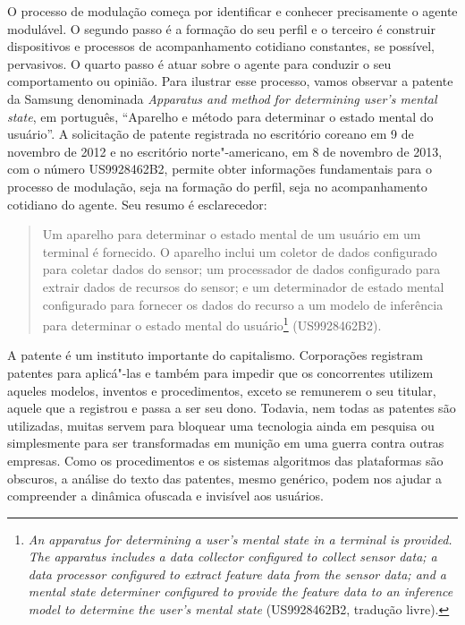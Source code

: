 O processo de modulação começa por identificar e conhecer precisamente o
agente modulável. O segundo passo é a formação do seu perfil e o
terceiro é construir dispositivos e processos de acompanhamento
cotidiano constantes, se possível, pervasivos. O quarto passo é atuar
sobre o agente para conduzir o seu comportamento ou opinião. Para
ilustrar esse processo, vamos observar a patente da Samsung denominada
\emph{Apparatus and method for determining user's mental state}, em
português, ``Aparelho e método para determinar o estado mental do
usuário''. A solicitação de patente registrada no escritório coreano em
9 de novembro de 2012 e no escritório norte"-americano, em 8 de novembro
de 2013, com o número US9928462B2, permite obter informações
fundamentais para o processo de modulação, seja na formação do perfil,
seja no acompanhamento cotidiano do agente. Seu resumo é esclarecedor:

\begin{quote}
Um aparelho para determinar o estado mental de um usuário em um terminal
é fornecido. O aparelho inclui um coletor de dados configurado para
coletar dados do sensor; um processador de dados configurado para
extrair dados de recursos do sensor; e um determinador de estado mental
configurado para fornecer os dados do recurso a um modelo de inferência
para determinar o estado mental do usuário\footnote{\emph{An apparatus for
  determining a user's mental state in a terminal is provided. The
  apparatus includes a data collector configured to collect sensor data;
  a data processor configured to extract feature data from the sensor
  data; and a mental state determiner configured to provide the feature
  data to an inference model to determine the user's mental state}
  (US9928462B2, tradução livre).} (US9928462B2).
\end{quote}

A patente é um instituto importante do capitalismo. Corporações
registram patentes para aplicá"-las e também para impedir que os
concorrentes utilizem aqueles modelos, inventos e procedimentos, exceto
se remunerem o seu titular, aquele que a registrou e passa a ser seu
dono. Todavia, nem todas as patentes são utilizadas, muitas servem para
bloquear uma tecnologia ainda em pesquisa ou simplesmente para ser
transformadas em munição em uma guerra contra outras empresas. Como os
procedimentos e os sistemas algoritmos das plataformas são obscuros, a
análise do texto das patentes, mesmo genérico, podem nos ajudar a
compreender a dinâmica ofuscada e invisível aos usuários.

